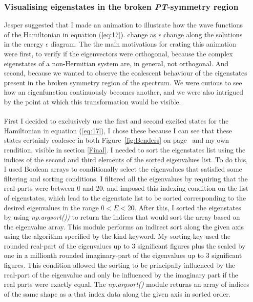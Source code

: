 \documentclass[10pt, a4paper, singlespacing, headsepline]{report}
\newcommand\PT{\emph{PT}}
\begin{document}
\subsubsection{Visualising eigenstates in the broken \PT-symmetry region}\label{Eigenstates explained}
Jesper suggested that I made an animation to illustrate how the wave functions of the Hamiltonian in equation (\ref{eq:17}). change as $\epsilon$ change along the solutions in the energy $\epsilon$ diagram. The the main motivations for crating this animation were first, to verify if the eigenvectors were orthogonal, because the complex eigenstates of a non-Hermitian system are, in general, not orthogonal. And second, because we wanted to observe the coalescent behaviour of the eigenstates present in the broken symmetry region of the spectrum. We were curious to see how an eigenfunction continuously becomes another, and we were also intrigued by the point at which this transformation would be visible.\\\\
First I decided to exclusively use the first and second excited states for the Hamiltonian in equation (\ref{eq:17}), I chose these because I can see that these states certainly coalesce in both Figure~\ref{fig:Benders} on page~\pageref{fig:Benders} and my own rendition, visible in section \ref{Final}.
I needed to sort the eigenstates list using the indices of the second and third elements of the sorted eigenvalues list. To do this, I used Boolean arrays to conditionally select the eigenvalues that satisfied some filtering and sorting conditions. I filtered all the eigenvalues by requiring that the real-parts were between 0 and 20. and imposed this indexing condition on the list of eigenstates, which lead to the eigenstate list to be sorted corresponding to the desired eigenvalues in the range $0< E < 20$.
After this, I sorted the eigenstates by using \emph{np.argsort())} to return the indices that would sort the array based on the eigenvalue array. This module performs an indirect sort along the given axis using the algorithm specified by the kind keyword. My sorting key used the rounded real-part of the eigenvalues up to 3 significant figures plus the scaled by one in a millionth rounded imaginary-part of the eigenvalues up to 3 significant figures. This condition allowed the sorting to be principally influenced by the real-part of the eigenvalue and only be influenced by the imaginary part if the real parts were exactly equal. The \emph{np.argsort()} module returns an array of indices of the same shape as a that index data along the given axis in sorted order\cite{argsort}.\\
\end{document}
